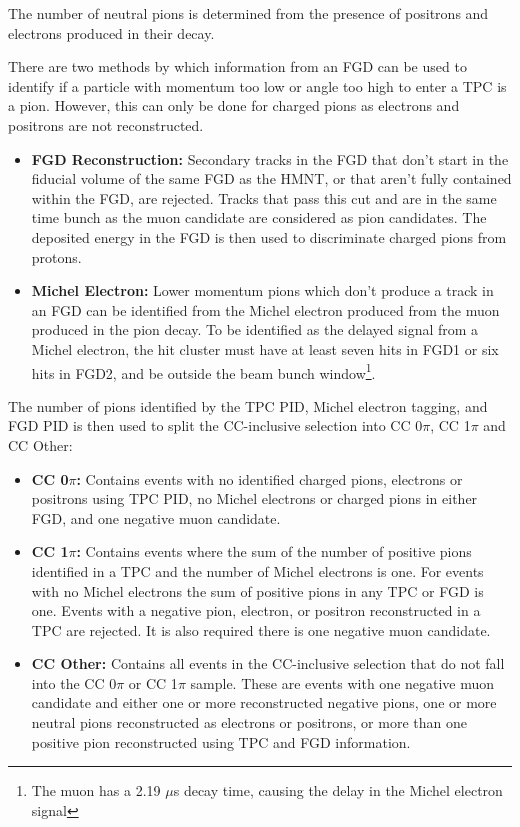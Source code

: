 \begin{itemize}
The number of neutral pions is determined from the presence of positrons and electrons produced in their decay.

There are two methods by which information from an FGD can be used to identify if a particle with momentum too low or angle too high to enter a TPC is a pion. However, this can only be done for charged pions as electrons and positrons are not reconstructed. 

\begin{itemize}

\item \textbf{FGD Reconstruction:} Secondary tracks in the FGD that don't start in the fiducial volume of the same FGD as the HMNT, or that aren't fully contained within the FGD, are rejected. Tracks that pass this cut and are in the same time bunch as the muon candidate are considered as pion candidates. The deposited energy in the FGD is then used to discriminate charged pions from protons.

\item \textbf{Michel Electron:} Lower momentum pions which don't produce a track in an FGD can be identified from the Michel electron produced from the muon produced in the pion decay. To be identified as the delayed signal from a Michel electron, the hit cluster must have at least seven hits in FGD1 or six hits in FGD2, and be outside the beam bunch window\footnote{The muon has a 2.19 $\mu$s decay time, causing the delay in the Michel electron signal}.

\end{itemize}
\end{itemize}

The number of pions identified by the TPC PID, Michel electron tagging, and FGD PID is then used to split the CC-inclusive selection into CC 0$\pi$, CC 1$\pi$ and CC Other:

\begin{itemize}

\item \textbf{CC 0$\pi$:} Contains events with no identified charged pions, electrons or positrons using TPC PID, no Michel electrons or charged pions in either FGD, and one negative muon candidate. 

\item \textbf{CC 1$\pi$:} Contains events where the sum of the number of positive pions identified in a TPC and the number of Michel electrons is one. For events with no Michel electrons the sum of positive pions in any TPC or FGD is one. Events with a negative pion, electron, or positron reconstructed in a TPC are rejected. It is also required there is one negative muon candidate.

\item \textbf{CC Other:} Contains all events in the CC-inclusive selection that do not fall into the CC 0$\pi$ or CC 1$\pi$ sample. These are events with one negative muon candidate and either one or more reconstructed negative pions, one or more neutral pions reconstructed as electrons or positrons, or more than one positive pion reconstructed using TPC and FGD information.

\end{itemize}

